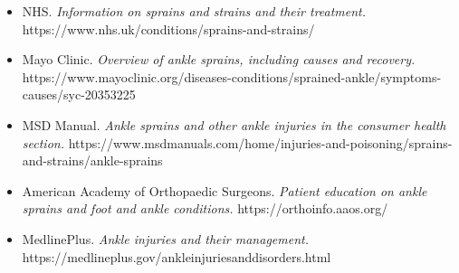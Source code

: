 \begin{itemize}
    \item NHS. \textit{Information on sprains and strains and their treatment.} https://www.nhs.uk/conditions/sprains-and-strains/
    \item Mayo Clinic. \textit{Overview of ankle sprains, including causes and recovery.} https://www.mayoclinic.org/diseases-conditions/sprained-ankle/symptoms-causes/syc-20353225
    \item MSD Manual. \textit{Ankle sprains and other ankle injuries in the consumer health section.} https://www.msdmanuals.com/home/injuries-and-poisoning/sprains-and-strains/ankle-sprains
    \item American Academy of Orthopaedic Surgeons. \textit{Patient education on ankle sprains and foot and ankle conditions.} https://orthoinfo.aaos.org/
    \item MedlinePlus. \textit{Ankle injuries and their management.} https://medlineplus.gov/ankleinjuriesanddisorders.html
\end{itemize}

